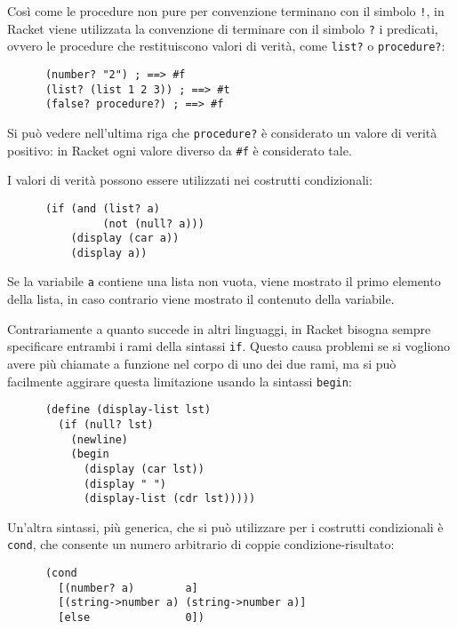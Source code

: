 Cos\`i come le procedure non pure per convenzione terminano con il
simbolo \lstinline{!}, in Racket viene utilizzata la convenzione di
terminare con il simbolo \lstinline{?} i predicati, ovvero le procedure
che restituiscono valori di verit\`a, come \lstinline{list?} o
\lstinline{procedure?}:

\begin{lstlisting}
      (number? "2") ; ==> #f
      (list? (list 1 2 3)) ; ==> #t
      (false? procedure?) ; ==> #f
\end{lstlisting}

Si pu\`o vedere nell'ultima riga che \lstinline{procedure?} \`e
considerato un valore di verit\`a positivo: in Racket ogni valore
diverso da \lstinline{#f} \`e considerato tale.

I valori di verit\`a possono essere utilizzati nei costrutti
condizionali:

\begin{lstlisting}
      (if (and (list? a)
               (not (null? a)))
          (display (car a))
          (display a))
\end{lstlisting}

Se la variabile \lstinline{a} contiene una lista non vuota, viene
mostrato il primo elemento della lista, in caso contrario viene
mostrato il contenuto della variabile.

Contrariamente a quanto succede in altri linguaggi, in Racket bisogna
sempre specificare entrambi i rami della sintassi \lstinline{if}.
Questo causa problemi se si vogliono avere pi\`u chiamate a funzione
nel corpo di uno dei due rami, ma si pu\`o facilmente aggirare questa
limitazione usando la sintassi \lstinline{begin}:

\begin{lstlisting}
      (define (display-list lst)
        (if (null? lst)
          (newline)
          (begin
            (display (car lst))
            (display " ")
            (display-list (cdr lst)))))
\end{lstlisting}

Un'altra sintassi, pi\`u generica, che si pu\`o utilizzare per i
costrutti condizionali \`e \lstinline{cond}, che consente un numero
arbitrario di coppie condizione-risultato:

\begin{lstlisting}
      (cond
        [(number? a)        a]
        [(string->number a) (string->number a)]
        [else               0])
\end{lstlisting}

